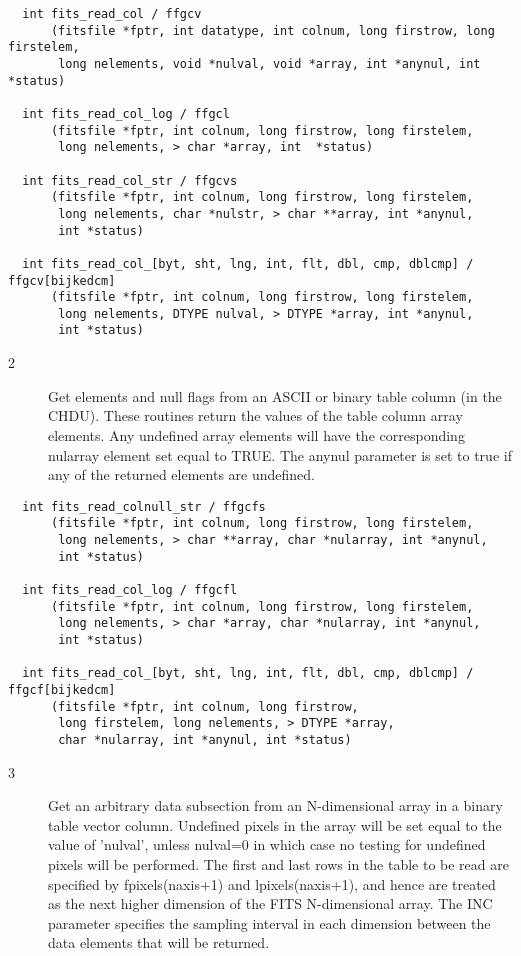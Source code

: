 \begin{verbatim}
  int fits_read_col / ffgcv
      (fitsfile *fptr, int datatype, int colnum, long firstrow, long firstelem,
       long nelements, void *nulval, void *array, int *anynul, int *status)

  int fits_read_col_log / ffgcl
      (fitsfile *fptr, int colnum, long firstrow, long firstelem,
       long nelements, > char *array, int  *status)

  int fits_read_col_str / ffgcvs
      (fitsfile *fptr, int colnum, long firstrow, long firstelem,
       long nelements, char *nulstr, > char **array, int *anynul,
       int *status)

  int fits_read_col_[byt, sht, lng, int, flt, dbl, cmp, dblcmp] / ffgcv[bijkedcm]
      (fitsfile *fptr, int colnum, long firstrow, long firstelem,
       long nelements, DTYPE nulval, > DTYPE *array, int *anynul,
       int *status)
\end{verbatim}

\begin{description}
\item[2 ]  Get elements and null flags from an ASCII or binary table column (in the
    CHDU).  These routines return the values of the table column array elements.
    Any undefined array elements will have the corresponding nularray element
    set equal to TRUE.  The anynul parameter is set to true if any of the
   returned elements are undefined.
\end{description}

\begin{verbatim}
  int fits_read_colnull_str / ffgcfs
      (fitsfile *fptr, int colnum, long firstrow, long firstelem,
       long nelements, > char **array, char *nularray, int *anynul,
       int *status)

  int fits_read_col_log / ffgcfl
      (fitsfile *fptr, int colnum, long firstrow, long firstelem,
       long nelements, > char *array, char *nularray, int *anynul,
       int *status)

  int fits_read_col_[byt, sht, lng, int, flt, dbl, cmp, dblcmp] / ffgcf[bijkedcm]
      (fitsfile *fptr, int colnum, long firstrow,
       long firstelem, long nelements, > DTYPE *array,
       char *nularray, int *anynul, int *status)
\end{verbatim}

\begin{description}
\item[3 ] Get an arbitrary data subsection from an N-dimensional array
    in a binary table vector column.  Undefined pixels
    in the array will be set equal to the value of 'nulval',
    unless nulval=0 in which case no testing for undefined pixels will
    be performed.  The first and last rows in the table to be read
    are specified by fpixels(naxis+1) and lpixels(naxis+1), and hence
    are treated as the next higher dimension of the FITS N-dimensional
    array.  The INC parameter specifies the sampling interval in
   each dimension between the data elements that will be returned.
\end{description}

